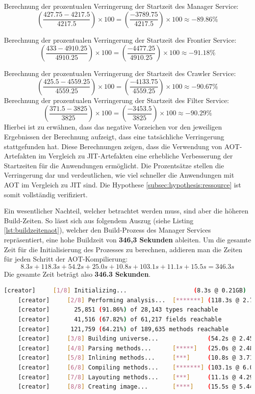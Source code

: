 Berechnung der prozentualen Verringerung der Startzeit des Manager Service:
\[
\left( \frac{427.75 - 4217.5}{4217.5} \right) \times 100 = \left( \frac{-3789.75}{4217.5} \right) \times 100 \approx -89.86\%
\]

Berechnung der prozentualen Verringerung der Startzeit des Frontier Service:
\[
\left( \frac{433 - 4910.25}{4910.25} \right) \times 100 = \left( \frac{-4477.25}{4910.25} \right) \times 100 \approx -91.18\%
\]

Berechnung der prozentualen Verringerung der Startzeit des Crawler Service:
\[
\left( \frac{425.5 - 4559.25}{4559.25} \right) \times 100 = \left( \frac{-4133.75}{4559.25} \right) \times 100 \approx -90.67\%
\]
Berechnung der prozentualen Verringerung der Startzeit des Filter Service:
\[
\left( \frac{371.5 - 3825}{3825} \right) \times 100 = \left( \frac{-3453.5}{3825} \right) \times 100 \approx -90.29\%
\]
Hierbei ist zu erwähnen, dass das negative Vorzeichen vor den jeweiligen Ergebnissen der Berechnung aufzeigt, dass eine tatsächliche Verringerung stattgefunden hat.
Diese Berechnungen zeigen, dass die Verwendung von \ac{AOT}-Artefakten im Vergleich zu \ac{JIT}-Artefakten eine erhebliche Verbesserung der Startzeiten für die Anwendungen ermöglicht. Die Prozentsätze stellen die Verringerung dar und verdeutlichen, wie viel schneller die Anwendungen mit \ac{AOT} im Vergleich zu \ac{JIT} sind. Die Hypothese \ref{subsec:hypothesis:ressource} ist somit vollständig verifiziert.

Ein wesentlicher Nachteil, welcher betrachtet werden muss, sind aber die höheren Build-Zeiten. So lässt sich aus folgendem Auszug (siehe Listing \ref{lst:buildzeitenaot}), welcher den Build-Prozess des Manager Services repräsentiert, eine hohe Buildzeit von \textbf{346,3 Sekunden} ableiten. Um die gesamte Zeit für die Initialisierung des Prozesses zu berechnen, addieren man die Zeiten für jeden Schritt der \ac{AOT}-Kompilierung:
\[
8.3s + 118.3s + 54.2s + 25.0s + 10.8s + 103.1s + 11.1s + 15.5s = 346.3s
\]
Die gesamte Zeit beträgt also \textbf{346.3 Sekunden}. 

\begin{lstlisting}[language=Bash, caption={Auszug des AOT-Build-Prozesses mit der Darstellung der Build-Zeiten.},label={lst:buildzeitenaot}]
    [creator]     [1/8] Initializing...                   (8.3s @ 0.21GB)
    [creator]     [2/8] Performing analysis...  [*******] (118.3s @ 2.71GB)
    [creator]       25,851 (91.86%) of 28,143 types reachable
    [creator]       41,516 (67.82%) of 61,217 fields reachable
    [creator]      121,759 (64.21%) of 189,635 methods reachable
    [creator]     [3/8] Building universe...              (54.2s @ 2.45GB)
    [creator]     [4/8] Parsing methods...      [*****]   (25.0s @ 2.48GB)
    [creator]     [5/8] Inlining methods...     [***]     (10.8s @ 3.71GB)
    [creator]     [6/8] Compiling methods...    [*******] (103.1s @ 6.05GB)
    [creator]     [7/8] Layouting methods...    [***]     (11.1s @ 4.29GB)
    [creator]     [8/8] Creating image...       [****]    (15.5s @ 5.44GB)
\end{lstlisting}
\chapterend
